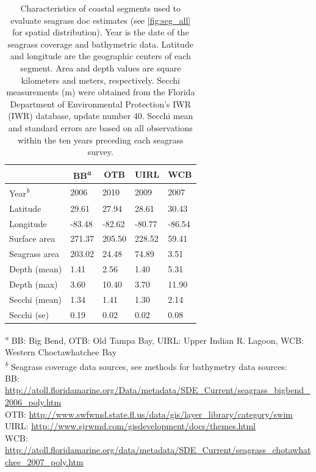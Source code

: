 \documentclass[letterpaper,12pt,oneside]{article}\usepackage[]{graphicx}\usepackage[]{color}
\begin{document}











\begin{table}[!tbp]
\caption{Characteristics of coastal segments used to evaluate seagrass \acl{doc} estimates (see \cref{fig:seg_all} for spatial distribution).  Year is the date of the seagrass coverage and bathymetric data.  Latitude and longitude are the geographic centers of each segment.  Area and depth values are square kilometers and meters, respectively.  Secchi measurements (m) were obtained from the Florida Department of Environmental Protection's \acl{IWR} (\acs{IWR}) database, update number 40.  Secchi mean and standard errors are based on all observations within the ten years preceding each seagrass survey.\label{tab:seg_summ}} 
\begin{center}
\begin{tabular}{lllll}
\hline\hline
\multicolumn{1}{l}{}&\multicolumn{1}{c}{BB\textsuperscript{\textit{a}}}&\multicolumn{1}{c}{OTB}&\multicolumn{1}{c}{UIRL}&\multicolumn{1}{c}{WCB}\tabularnewline
\hline
Year\textsuperscript{\textit{b}}&2006&2010&2009&2007\tabularnewline
Latitude& 29.61& 27.94& 28.61& 30.43\tabularnewline
Longitude&-83.48&-82.62&-80.77&-86.54\tabularnewline
Surface area&271.37&205.50&228.52& 59.41\tabularnewline
Seagrass area&203.02& 24.48& 74.89&  3.51\tabularnewline
Depth (mean)&  1.41&  2.56&  1.40&  5.31\tabularnewline
Depth (max)&  3.60& 10.40&  3.70& 11.90\tabularnewline
Secchi (mean)&  1.34&  1.41&  1.30&  2.14\tabularnewline
Secchi (se)&  0.19&  0.02&  0.02&  0.08\tabularnewline
\hline
\end{tabular}\end{center}

\footnotesize \textsuperscript{\textit{a}} BB: Big Bend, OTB: Old Tampa Bay, UIRL: Upper Indian R. Lagoon, WCB: Western Choctawhatchee Bay\\\textsuperscript{\textit{b}} Seagrass coverage data sources, see methods for bathymetry data sources:\scriptsize\\BB: \url{http://atoll.floridamarine.org/Data/metadata/SDE_Current/seagrass_bigbend_2006_poly.htm}\\OTB: \url{http://www.swfwmd.state.fl.us/data/gis/layer_library/category/swim}\\UIRL: \url{http://www.sjrwmd.com/gisdevelopment/docs/themes.html}\\WCB: \url{http://atoll.floridamarine.org/data/metadata/SDE_Current/seagrass_chotawhatchee_2007_poly.htm}\end{table}
\end{document}
